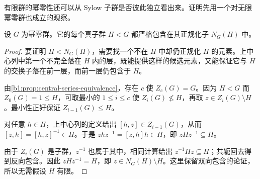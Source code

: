 有限群的幂零性还可以从 Sylow 子群是否彼此独立看出来。证明先用一个对无限幂零群也成立的观察。

\begin{lemma}[幂零群的正规化子条件]\label{b1:lem:nilpotent-normalizer}
	设 \(G\) 为幂零群。它的每个真子群 \(H<G\) 都严格包含在其正规化子 \(N_G(H)\) 中。
\end{lemma}
\begin{proof}
	要证明 \(H<N_G(H)\)，需要找一个不在 \(H\) 中却仍正规化 \(H\) 的元素。上中心列中第一个不完全落在 \(H\) 内的层，既能提供这样的候选元素，又能保证它与 \(H\) 的交换子落在前一层，而前一层仍包含于 \(H\)。

	由\cref{b1:prop:central-series-equivalence}，存在 \(c\) 使 \(Z_c(G)=G\)。因为 \(H<G\) 而 \(Z_0(G)=1\le H\)，可取最小的 \(1\le i\le c\) 使 \(Z_i(G)\not\le H\)，再取 \(z\in Z_i(G)\setminus H\)。最小性正好保证 \(Z_{i-1}(G)\le H\)。

	对任意 \(h\in H\)，上中心列的定义给出 \([h,z]\in Z_{i-1}(G)\)，从而 \([z,h]=[h,z]^{-1}\in H\)。于是 \(zhz^{-1}=[z,h]h\in H\)，即 \(zHz^{-1}\subseteq H\)。

	由于 \(Z_i(G)\) 是子群，\(z^{-1}\) 也属于其中，相同计算给出 \(z^{-1}Hz\subseteq H\)；共轭回去得到反向包含。因此 \(zHz^{-1}=H\)，即 \(z\in N_G(H)\setminus H\)。这里保留双向包含的论证，所以无需假设 \(H\) 有限。
\end{proof}

